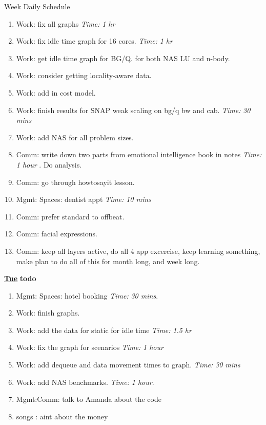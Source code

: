 \documentclass[serif, mathserif, final]{beamer}
\newcommand{\timeEst}[1]{\textit{Time:} \textit{#1}}
\begin{document}
\begin{frame}{}
\begin{columns}
\begin{column}{0.50\linewidth}
\begin{block}{Week Daily Schedule}
\begin{enumerate}
   \tiny \item \tiny Work: fix all graphs \timeEst{1 hr}
   \item \tiny Work: fix idle time graph for 16 cores. \timeEst{1 hr} 
   \item \tiny Work: get idle time graph for BG/Q. for both NAS LU and n-body.
   \item \tiny Work: consider getting locality-aware data. 
   \item \tiny Work: add in cost model. 
   \item \tiny Work: finish results for SNAP weak scaling on bg/q bw and cab. \timeEst{30 mins} 
   \item \tiny Work: add NAS for all problem sizes. 
   \item \tiny Comm: write down two parts from emotional intelligence book in notes \timeEst{1 hour} . Do analysis. 
   \item \tiny Comm: go through howtosayit lesson. 
   \item \tiny Mgmt: Spaces: dentist appt \timeEst{10 mins} 

   \item \tiny Comm: prefer standard to offbeat. 
   \item \tiny Comm: facial expressions. 
   \item \tiny Comm: keep all layers active, do all 4 app excercise, keep learning something, make plan to do all of this for month long, and week long. 
  \end{enumerate} 

  \textbf{\small \underline{Tue}} 
  \textbf{todo} 
  \begin{enumerate} 
  \item \tiny Mgmt: Spaces: hotel booking \timeEst{30 mins}. 
  \item \tiny Work: finish graphs.  
  \item \tiny Work: add the data for static for idle time \timeEst{1.5 hr} 
  \item \tiny Work: fix the graph for scenarios \timeEst{1 hour} 
  \item \tiny Work: add dequeue and data movement times to graph.  \timeEst{30 mins} 
  \item \tiny Work: add NAS benchmarks. \timeEst{1 hour}.  
  \item \tiny Mgmt:Comm: talk to Amanda about the code 
    \tiny \item \tiny songs : aint about the money 
    
  \end{enumerate} 


\end{block}
\end{column}
\end{columns}
\end{frame}
\end{document}
